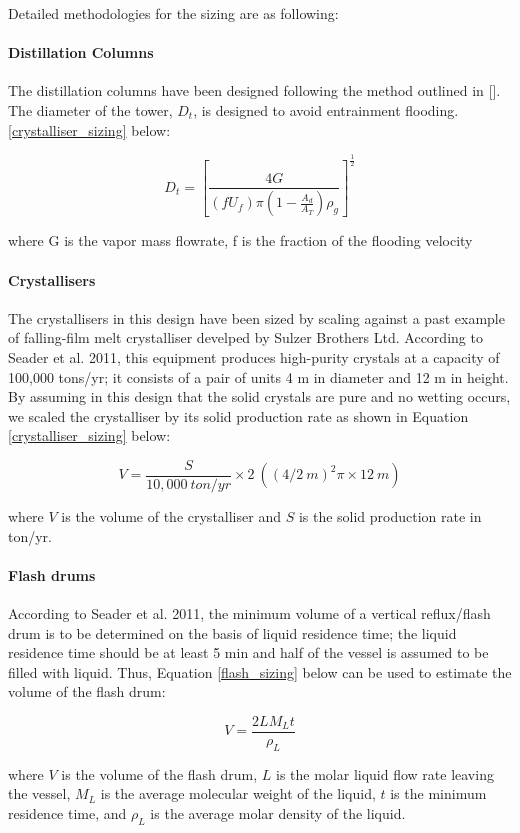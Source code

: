 Detailed methodologies for the sizing are as following:

\paragraph{Distillation Columns}
The distillation columns have been designed following the method outlined in []. The diameter  of the tower, $D_t$, is designed to avoid entrainment flooding.  \ref{crystalliser_sizing} below:

\begin{equation}
    D_t = [\frac{4G}{(fU_f)\pi(1-\frac{A_d}{A_T})\rho_g}]^\frac{1}{2}
    \label{crystalliser_sizing}
\end{equation}

where G is the vapor mass flowrate, f is the fraction of the flooding velocity

\paragraph{Crystallisers}
The crystallisers in this design have been sized by scaling against a past example of falling-film melt crystalliser develped by Sulzer Brothers Ltd. According to Seader et al. 2011, \cite{seader_separation_2011} this equipment produces high-purity crystals at a capacity of 100,000 tons/yr; it consists of a pair of units 4 m in diameter and 12 m in height. By assuming in this design that the solid crystals are pure and no wetting occurs, we scaled the crystalliser by its solid production rate as shown in Equation \ref{crystalliser_sizing} below:

\begin{equation}
    V = \frac{S}{10,000~ton/yr} \times 2~((4/2~m)^2 \pi \times 12~m)
    \label{crystalliser_sizing}
\end{equation}

where $V$ is the volume of the crystalliser and $S$ is the solid production rate in ton/yr. 

\paragraph{Flash drums}
According to Seader et al. 2011, \cite{seader_separation_2011} the minimum volume of a vertical reflux/flash drum is to be determined on the basis of liquid residence time; the liquid residence time should be at least 5 min and half of the vessel is assumed to be filled with liquid. Thus, Equation \ref{flash_sizing} below can be used to estimate the volume of the flash drum:

\begin{equation}
    V = \frac{2 L M_L t}{\rho_{L}}
    \label{flash_sizing}
\end{equation}

where $V$ is the volume of the flash drum, $L$ is the molar liquid flow rate leaving the vessel, $M_L$ is the average molecular weight of the liquid, $t$ is the minimum residence time, and $\rho_L$ is the average molar density of the liquid. 